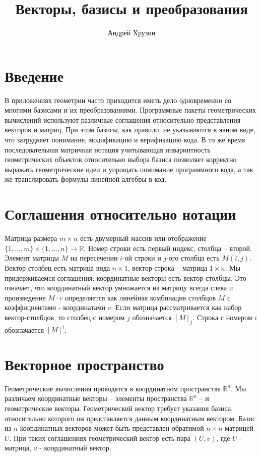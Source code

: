 \documentclass[a4paper]{article}
\author{Андрей Хрузин}
\title{Векторы, базисы и преобразования}
\begin{document}
\maketitle

\section{Введение}
В приложениях геометрии часто приходится иметь дело одновременно со многими базисами и их преобразованиями. Программные пакеты геометрических вычислений используют различные соглашения относительно представления векторов и матриц. При этом базисы, как правило, не указываются в явном виде, что затрудняет понимание, модификацию и верификацию кода. В то же время последовательная матричная нотация учитывающая инваринтность геометрических объектов относительно выбора базиса позволяет корректно выражать геометрические идеи и упрощать понимание программного кода, а так же транслировать формулы линейной алгебры в код.

\section{Соглашения относительно нотации}
Матрица размера $m \times n$ есть двумерный массив или отображение $\{ 1, \dots, m \} \times \{ 1, \dots, n \} \to \mathbb R$. Номер строки есть первый индекс, столбца -- второй. Элемент матрицы $M$ на пересечении $i$-ой строки и $j$-ого столбца есть $M(i, j)$. Вектор-столбец есть матрица вида $n \times 1$, вектор-строка -- матрица $1 \times n$. Мы придерживаемся соглашения: координатные векторы есть вектор-столбцы. Это означает, что координатный вектор умножается на матрицу всегда слева и  произведение $M \cdot v$ определяется как линейная комбинация столбцов $M$ с коэффициентами - координатами $v$. Если матрица рассматривается как набор вектор-столбцов, то столбец с номером $j$ обозначается $[ M ]_j$. Строка с номером $i$ обозначается $[M]^i$.


\section{Векторное пространство}
Геометрические вычисления проводятся в координатном пространстве $\mathbb R^n$. Мы различаем координатные векторы -- элементы пространства $\mathbb R^n$ -- и геометрические векторы. Геометрический вектор требует указания базиса, относительно которого он представляется данным координатным вектором. Базис из $n$ координатных векторов может быть представлен обратимой $n \times n$ матрицей $U$. При таких соглашениях геометрический вектор есть пара $(U, v)$, где $U$ - матрица, $v$ - координатный вектор.
\end{document}
